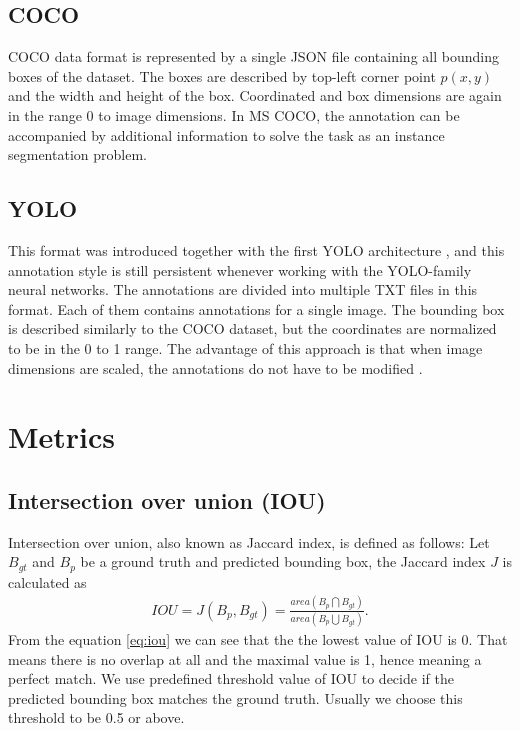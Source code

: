\subsection{COCO}
COCO data format is represented by a single JSON file containing all bounding boxes of the dataset. The boxes are described by top-left corner point $p(x,y)$ and the width and height of the box. Coordinated and box dimensions are again in the range 0 to image dimensions. In MS COCO, the annotation can be accompanied by additional information to solve the task as an instance segmentation problem.
\subsection{YOLO}
This format was introduced together with the first YOLO architecture \cite{Redmon2015}, and this annotation style is still persistent whenever working with the YOLO-family neural networks.
The annotations are divided into multiple TXT files in this format. Each of them contains annotations for a single image.
The bounding box is described similarly to the COCO dataset, but the coordinates are normalized to be in the 0 to 1 range. The advantage of this approach is that when image dimensions are scaled, the annotations do not have to be modified \cite{Redmon2015,Padilla2021}.


\section{Metrics}
\subsection{Intersection over union (IOU) }
Intersection over union, also known as Jaccard index, is defined as follows: Let $B_{gt}$ and $B_p$ be a ground truth and predicted bounding box, the Jaccard index $J$ is calculated as
\begin{align}
    IOU = J(B_p, B_{gt}) = \frac{area(B_p \bigcap B_{gt})}{area(B_p \bigcup B_{gt})}.
    \label{eq:iou}
\end{align}
From the equation \ref{eq:iou} we can see that the the lowest value of IOU is 0. That means there is no overlap at all and the maximal value is 1, hence meaning a perfect match.
We use predefined threshold value of IOU to decide if the predicted bounding box matches the ground truth. Usually we choose this threshold to be 0.5 or above.

